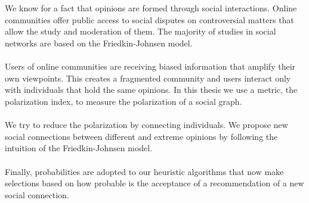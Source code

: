 \chapter*{\abstractname}
\addstarredchapter{\abstractname} %

\noindent We know for a fact that opinions are formed through social interactions. Online communities offer public access to social disputes on controversial matters that allow the study and moderation of them. The majority of studies in social networks are based on the Friedkin-Johnsen model.
\\
\\
Users of online communities are receiving biased information that amplify their own viewpoints. This creates a fragmented community and users interact only with individuals that hold the same opinions. In this thesis we use a metric, the polarization index, to measure the polarization of a social graph.
\\
\\We try to reduce the polarization by connecting individuals. We propose new social connections between different and extreme opinions by following the intuition of the Friedkin-Johnsen model. 
\\
\\
Finally, probabilities are adopted to our heuristic algorithms that now make selections based on how probable is the acceptance of a recommendation of a new social connection. 

\bigskip
